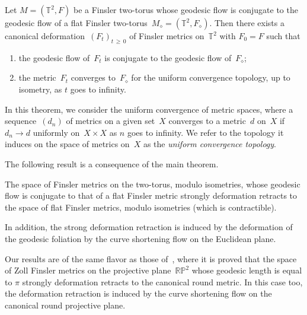 \documentclass[AHL,Unicode,longabstracts,published]{cedram}
\newcommand{\R}{\mathbb{R}}
\newcommand{\T}{\mathbb{T}}
\newcommand{\Prob}{\mathbb{P}}
\begin{document}
\begin{theo}
Let $M=(\T^2,F)$ be a Finsler two-torus whose geodesic flow is conjugate to the geodesic flow of a flat Finsler two-torus~$M_\diamond = (\T^2,F_\diamond)$. Then there exists a canonical deformation~$(F_t)_{t\,\geq\,0}$ of Finsler metrics on~$\T^2$ with $F_0=F$ such that
\begin{enumerate}
\item\label{theo1.1.1} the geodesic flow of~$F_t$ is conjugate to the geodesic flow of~$F_\diamond$;
\item\label{theo1.1.2} the metric~$F_t$ converges to~$F_\diamond$ for the uniform convergence topology, up to isometry, as $t$ goes to infinity.
\end{enumerate}
\end{theo}

In this theorem, we consider the uniform convergence of metric spaces, where a sequence~$(d_n)$ of metrics on a given set~$X$ converges to a metric~$d$ on~$X$ if $d_n \to d$ uniformly on~$X \times X$ as $n$ goes to infinity. We refer to the topology it induces on the space of metrics on~$X$ as the \emph{uniform convergence topology}.

The following result is a consequence of the main theorem.

\begin{coro}\label{coro:main}
The space of Finsler metrics on the two-torus, modulo isometries, whose geodesic flow is conjugate to that of a flat Finsler metric strongly deformation retracts to the space of flat Finsler metrics, modulo isometries (which is contractible).

In addition, the strong deformation retraction is induced by the deformation of the geodesic foliation by the curve shortening flow on the Euclidean plane.
\end{coro}

Our results are of the same flavor as those of~\cite{Sa19}, where it is proved that the space of Zoll Finsler metrics on the projective plane~$\R \Prob^{2}$ whose geodesic length is equal to $\pi$ strongly deformation retracts to the canonical round metric. In this case too, the deformation retraction is induced by the curve shortening flow on the canonical round projective plane.
\end{document}
